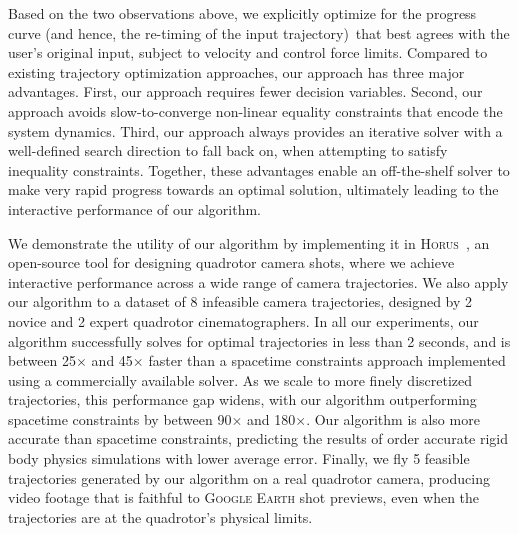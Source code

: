 Based on the two observations above, we explicitly optimize for the progress curve (and hence, the re-timing of the input trajectory)\ that best agrees with the user's original input, subject to velocity and control force limits.
Compared to existing trajectory optimization approaches, our approach has three major advantages. First, our approach requires fewer decision variables.
Second, our approach avoids slow-to-converge non-linear equality constraints that encode the system dynamics.
Third, our approach always provides an iterative solver with a well-defined search direction to fall back on, when attempting to satisfy inequality constraints.
Together, these advantages enable an off-the-shelf solver to make very rapid progress towards an optimal solution, ultimately leading to the interactive performance of our algorithm.

We demonstrate the utility of our algorithm by implementing it in \textsc{Horus}~\cite{joubert:2015}, an open-source tool for designing quadrotor camera shots, where we achieve interactive performance across a wide range of camera trajectories.
We also apply our algorithm to a dataset of 8 infeasible camera trajectories, designed by 2 novice and 2 expert quadrotor cinematographers.
In all our experiments, our algorithm successfully solves for optimal trajectories in less than 2 seconds, and is between 25$\times$ and 45$\times$ faster than a spacetime constraints approach implemented using a commercially available solver.
As we scale to more finely discretized trajectories, this performance gap widens, with our algorithm outperforming spacetime constraints by between 90$\times$ and 180$\times$.
Our algorithm is also more accurate than spacetime constraints, predicting the results of  order accurate rigid body physics simulations with lower average error.
Finally, we fly 5 feasible trajectories generated by our algorithm on a real quadrotor camera, producing video footage that is faithful to \textsc{Google Earth} shot previews, even when the trajectories are at the quadrotor's physical limits.
